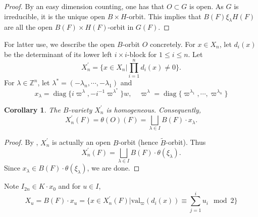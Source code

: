 \documentclass{amsart}
\newtheorem{cor}[theorem]{Corollary}
\theoremstyle{definition}
\theoremstyle{remark}
\newcommand{\1}{\mathbf{1}}
\DeclareMathOperator{\diag}{diag}
\theoremstyle{definition}
\newcommand{\BZ}{{\mathbb {Z}}}
\newcommand{\wt}{\widetilde}
\begin{document}
\begin{proof}
 By an easy dimension counting, one has that $O\subset G$ is open. As $G$ is irreducible, it is the unique open $B\times H$-orbit. This implies that $B(F)\xi_\lambda H(F)$ are all the open $B(F)\times H(F)$-orbit in $G(F)$.
\end{proof}
For latter use, we  describe the open $B$-orbit $O$ concretely. For $x\in X_n$, let $d_i(x)$ be the determinant of its lower left $i\times i$-block for $1\leq i\leq n$. 
Let \[X_n^\prime=\{x\in X_n| \prod_{i=1}^n d_i(x)\neq 0\}.\]
For $\lambda\in \BZ^n$, let  $\lambda^*=(-\lambda_n,\cdots,-\lambda_1)$ and  \[x_\lambda=\diag\{i\varpi^{\lambda}, -i^{-1}\varpi^{\lambda^*}\}w,\quad \varpi^\lambda=\diag\{\varpi^{\lambda_1},\cdots,\varpi^{\lambda_n}\} \]
\begin{cor} The $B$-variety $X_n^\prime$ is homogeneous. Consequently, \[X_n^\prime(F)=\theta(O)(F)=\bigsqcup_{\lambda\in I} B(F)\cdot x_\lambda.\]
\end{cor}
\begin{proof}By \cite[Lemma 5.7]{Off04}, $X_n^\prime$ is actually an open $B$-orbit (hence $\wt{B}$-orbit). Thus \[X_n^\prime(F)=\bigsqcup_{\lambda\in I} B(F)\cdot \theta(\xi_\lambda).\] Since $x_\lambda\in B(F)\cdot \theta(\xi_\lambda)$, we are done.
\end{proof}
Note $I_{2n}\in K\cdot x_0$ and for $u\in I$, \[X_u=B(F)\cdot x_u=\{x\in X_n^\prime(F)|\mathrm{val}_\varpi(d_i(x))\equiv \sum_{j=1}^iu_i \mod 2\}\]
\end{document}
